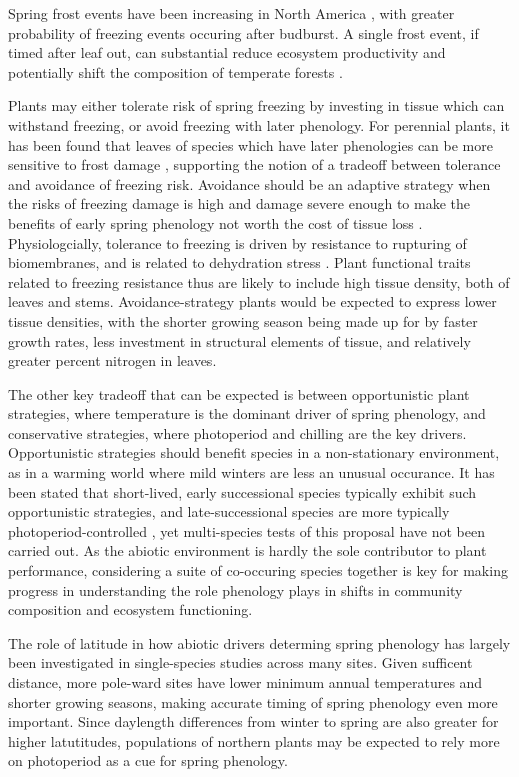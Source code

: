 \documentclass[11pt]{article}
\begin{document}
Spring frost events have been increasing in North America \cite{Augspurger:2013aa}, with greater probability of freezing events occuring after budburst. A single frost event, if timed after leaf out, can substantial reduce ecosystem productivity \cite{Gu:2008aa} and potentially shift the composition of temperate forests \cite{Hufkens:2012aa}. 

Plants may either tolerate risk of spring freezing by investing in tissue which can withstand freezing, or avoid freezing with later phenology. For perennial plants, it has been found that leaves of species which have later phenologies can be more sensitive to frost damage \cite{CaraDonna:2014aa}\cite{Vitasse:2014aa}, supporting the notion of a tradeoff between tolerance and avoidance of freezing risk. Avoidance should be an adaptive strategy when the risks of freezing damage is high and damage severe enough to make the benefits of early spring phenology not worth the cost of tissue loss \cite{Sakai:1987aa}. Physiologcially, tolerance to freezing is driven by resistance to rupturing of biomembranes, and is related to dehydration stress \cite{Larcher:2005aa}. Plant functional traits related to freezing resistance thus are likely to include high tissue density, both of leaves and stems. Avoidance-strategy plants would be expected to express lower tissue densities, with the shorter growing season being made up for by faster growth rates, less investment in structural elements of tissue, and relatively greater percent nitrogen in leaves. 

The other key tradeoff that can be expected is between opportunistic plant strategies, where temperature is the dominant driver of spring phenology, and conservative strategies, where photoperiod and chilling are the key drivers. Opportunistic strategies should benefit species in a non-stationary environment, as in a warming world where mild winters are less an unusual occurance. It has been stated that short-lived, early successional species typically exhibit such opportunistic strategies, and late-successional species are more typically photoperiod-controlled \cite{Korner:2010}, yet multi-species tests of this proposal have not been carried out. As the abiotic environment is hardly the sole contributor to plant performance, considering a suite of co-occuring species together is key for making progress in understanding the role phenology plays in shifts in community composition and ecosystem functioning. 

The role of latitude in how abiotic drivers determing spring phenology has largely been investigated in single-species studies across many sites. Given sufficent distance, more pole-ward sites have lower minimum annual temperatures and shorter growing seasons, making accurate timing of spring phenology even more important. Since daylength differences from winter to spring are also greater for higher latutitudes, populations of northern plants may be expected to rely more on photoperiod as a cue for spring phenology.
\end{document}
